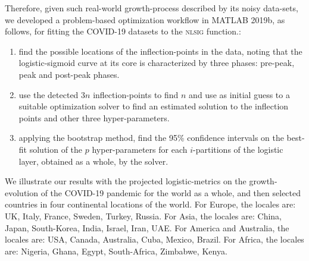 \documentclass[journal]{IEEEtran}
\theoremstyle{plain}
\theoremstyle{definition}
\theoremstyle{remark}
\begin{document}
Therefore, given such real-world growth-process described by its noisy data-sets, we developed a problem-based optimization workflow in MATLAB 2019b, as follows, for fitting the COVID-19 datasets to the \textsc{nlsig} function.:
\begin{enumerate}
	\item find the possible locations of the inflection-points in the data, noting that the logistic-sigmoid curve at its core is characterized by three phases: pre-peak, peak and post-peak phases.
	\item use the detected $3n$ inflection-points to find $n$ and use as initial guess to a suitable optimization solver to find an estimated solution to the inflection points and other three hyper-parameters.
	\item applying the bootstrap method, find the 95\% confidence intervals on the best-fit solution of the $p$ hyper-parameters for each $i$-partitions of the logistic layer, obtained as a whole, by the solver.
\end{enumerate}
We illustrate our results with the projected logistic-metrics on the growth-evolution of the COVID-19 pandemic for the world as a whole, and then selected countries in four continental locations of the world.
For Europe, the locales are: UK, Italy, France, Sweden, Turkey, Russia. For Asia, the locales are: China, Japan, South-Korea, India, Israel, Iran, UAE. For America and Australia, the locales are: USA, Canada, Australia, Cuba, Mexico, Brazil. For Africa, the locales are: Nigeria, Ghana, Egypt, South-Africa, Zimbabwe, Kenya.
\end{document}
